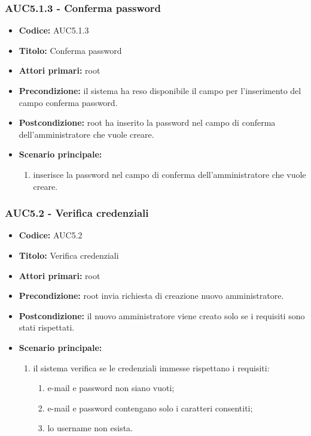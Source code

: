 \documentclass[casi-duso]{subfiles}
\begin{document}
\subsubsection{AUC5.1.3 - Conferma password}%
\label{subsub:AUC5.1.3}
\begin{itemize}
  \item \textbf{Codice:} AUC5.1.3
  \item \textbf{Titolo:} Conferma password
  \item \textbf{Attori primari:} root
  \item \textbf{Precondizione:} il sistema ha reso disponibile il campo per l'inserimento del campo conferma password.
  \item \textbf{Postcondizione:} root ha inserito la password nel campo di conferma dell'amministratore che vuole creare.
  \item \textbf{Scenario principale:}
  \begin{enumerate}
    \item {} inserisce la password nel campo di conferma dell'amministratore che vuole creare.
  \end{enumerate}
\end{itemize}

\subsubsection{AUC5.2 - Verifica credenziali}%
\label{subsub:AUC5.2}
\begin{itemize}
  \item \textbf{Codice:} AUC5.2
  \item \textbf{Titolo:} Verifica credenziali
  \item \textbf{Attori primari:} root
  \item \textbf{Precondizione:} root invia richiesta di creazione nuovo amministratore.
  \item \textbf{Postcondizione:} il nuovo amministratore viene creato solo se i requisiti sono stati rispettati.
  \item \textbf{Scenario principale:}
  \begin{enumerate}
    \item il sistema verifica se le credenziali immesse rispettano i requisiti:
    \begin{enumerate}
      \item e-mail e password non siano vuoti;
      \item e-mail e password contengano solo i caratteri consentiti;
      \item lo username non esista.
    \end{enumerate}
  \end{enumerate}
\end{itemize}
\end{document}
